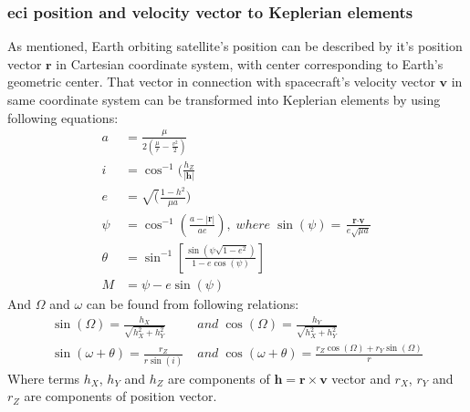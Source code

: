     \subsubsection{\ac{eci} position and velocity vector to Keplerian elements}
        As mentioned, Earth orbiting satellite's position can be described by it's position vector $\textbf{r}$ in Cartesian coordinate system, with center corresponding to Earth's geometric center. That vector in connection with spacecraft's velocity vector $\textbf{v}$ in same coordinate system can be transformed into Keplerian elements by using following equations:
        \begin{align}
            a &= \frac{\mu}{2\left(\frac{\mu}{r}-\frac{v^2}{2}\right)} \\
            i &= \cos^{-1}(\frac{h_Z}{|\textbf{h}|} \\
            e &= \sqrt(\frac{1-h^2}{\mu a}) \\
            \psi &= \cos^{-1}\left(\frac{a-|\textbf{r}|}{ae}\right), \; where \; \sin(\psi) = \frac{\textbf{r}\cdot\textbf{v}}{e\sqrt{\mu a}} \\
            \theta &= \sin^{-1}\left[\frac{\sin(\psi \sqrt{1-e^2})}{1-e\cos(\psi)}\right] \\
            M & = \psi - e\sin(\psi)
        \end{align}
        And $\Omega$ and $\omega$ can be found from following relations:
        \begin{align}
            \sin(\Omega) = \frac{h_X}{\sqrt{h^2_X+h^2_Y}}\; & and\; \cos(\Omega) = \frac{h_Y}{\sqrt{h^2_X+h^2_Y}} \\
            \sin(\omega+\theta) = \frac{r_Z}{r\sin(i)}\; & and\; \cos(\omega+\theta) = \frac{r_Z\cos(\Omega)+r_Y\sin(\Omega)}{r}
        \end{align}
        Where terms $h_X$, $h_Y$ and $h_Z$ are components of $\textbf{h}=\textbf{r}\times \textbf{v}$ vector and $r_X$, $r_Y$ and $r_Z$ are components of position vector.
    
